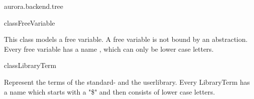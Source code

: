 \begin{texdocpackage}{aurora.backend.tree}
\begin{texdocclass}{class}{FreeVariable}
\label{texdoclet:aurora.backend.tree.FreeVariable}
\begin{texdocclassintro}
This class models a free variable. A free variable is not bound by an abstraction.
 Every free variable has a name , which can only be lower case letters.\end{texdocclassintro}
\begin{texdocclassconstructors}
\end{texdocclassconstructors}
\begin{texdocclassmethods}
\end{texdocclassmethods}
\end{texdocclass}


\begin{texdocclass}{class}{LibraryTerm}
\label{texdoclet:aurora.backend.tree.LibraryTerm}
\begin{texdocclassintro}
Represent the terms of the standard- and the userlibrary.
 Every LibraryTerm has a name which starts with a "\$" and then consists of lower case letters.\end{texdocclassintro}
\begin{texdocclassconstructors}
\end{texdocclassconstructors}
\begin{texdocclassmethods}
\end{texdocclassmethods}
\end{texdocclass}



\end{texdocpackage}
